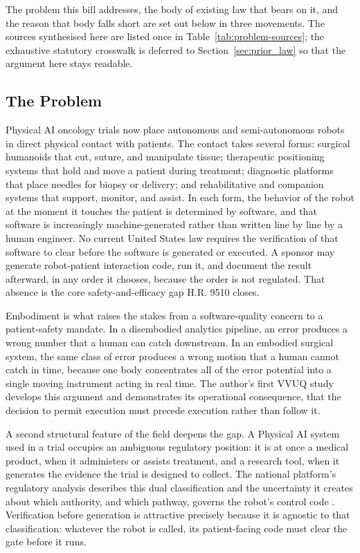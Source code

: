 
The problem this bill addresses, the body of existing law that bears on it, and
the reason that body falls short are set out below in three movements. The
sources synthesised here are listed once in Table~\ref{tab:problem-sources}; the
exhaustive statutory crosswalk is deferred to
Section~\ref{sec:prior_law} so that the argument here stays readable.

\subsection{The Problem}

Physical AI oncology trials now place autonomous and semi-autonomous robots in
direct physical contact with patients. The contact takes several forms:
surgical humanoids that cut, suture, and manipulate tissue; therapeutic
positioning systems that hold and move a patient during treatment; diagnostic
platforms that place needles for biopsy or delivery; and rehabilitative and
companion systems that support, monitor, and assist. In each form, the behavior
of the robot at the moment it touches the patient is determined by software, and
that software is increasingly machine-generated rather than written line by line
by a human engineer. No current United States law requires the verification of
that software to clear before the software is generated or executed. A sponsor
may generate robot-patient interaction code, run it, and document the result
afterward, in any order it chooses, because the order is not regulated. That
absence is the core safety-and-efficacy gap H.R. 9510 closes.

Embodiment is what raises the stakes from a software-quality concern to a
patient-safety mandate. In a disembodied analytics pipeline, an error produces a
wrong number that a human can catch downstream. In an embodied surgical system,
the same class of error produces a wrong motion that a human cannot catch in
time, because one body concentrates all of the error potential into a single
moving instrument acting in real time. The author's first VVUQ study
\cite{kawchak2026vvuq01} develops this argument and demonstrates its operational
consequence, that the decision to permit execution must precede execution rather
than follow it.

A second structural feature of the field deepens the gap. A Physical AI system
used in a trial occupies an ambiguous regulatory position: it is at once a
medical product, when it administers or assists treatment, and a research tool,
when it generates the evidence the trial is designed to collect. The national
platform's regulatory analysis describes this dual classification and the
uncertainty it creates about which authority, and which pathway, governs the
robot's control code \cite{kawchak2026national}. Verification before generation
is attractive precisely because it is agnostic to that classification: whatever
the robot is called, its patient-facing code must clear the gate before it runs.

